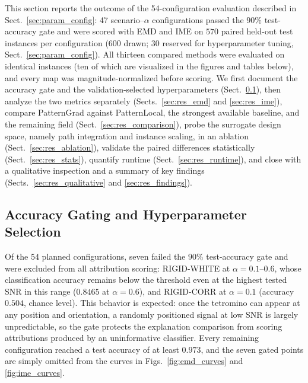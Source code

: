 \documentclass[pdflatex,sn-mathphys-num]{sn-jnl}
\theoremstyle{thmstyleone}
\theoremstyle{thmstyletwo}%
\theoremstyle{thmstylethree}%
\begin{document}
This section reports the outcome of the 54-configuration evaluation described in Sect.~\ref{sec:param_config}: 47 scenario--$\alpha$ configurations passed the $90\%$ test-accuracy gate and were scored with EMD and IME on $570$ paired held-out test instances per configuration ($600$ drawn; $30$ reserved for hyperparameter tuning, Sect.~\ref{sec:param_config}). All thirteen compared methods were evaluated on identical instances (ten of which are visualized in the figures and tables below), and every map was magnitude-normalized before scoring. We first document the accuracy gate and the validation-selected hyperparameters (Sect.~\ref{sec:gate}), then analyze the two metrics separately (Sects.~\ref{sec:res_emd} and \ref{sec:res_ime}), compare PatternGrad against PatternLocal, the strongest available baseline, and the remaining field (Sect.~\ref{sec:res_comparison}), probe the surrogate design space, namely path integration and instance scaling, in an ablation (Sect.~\ref{sec:res_ablation}), validate the paired differences statistically (Sect.~\ref{sec:res_stats}), quantify runtime (Sect.~\ref{sec:res_runtime}), and close with a qualitative inspection and a summary of key findings (Sects.~\ref{sec:res_qualitative} and \ref{sec:res_findings}).

\subsection{Accuracy Gating and Hyperparameter Selection}\label{sec:gate}

Of the 54 planned configurations, seven failed the $90\%$ test-accuracy gate and were excluded from all attribution scoring: RIGID-WHITE at $\alpha = 0.1$--$0.6$, whose classification accuracy remains below the threshold even at the highest tested SNR in this range ($0.8465$ at $\alpha = 0.6$), and RIGID-CORR at $\alpha = 0.1$ (accuracy $0.504$, chance level). This behavior is expected: once the tetromino can appear at any position and orientation, a randomly positioned signal at low SNR is largely unpredictable, so the gate protects the explanation comparison from scoring attributions produced by an uninformative classifier. Every remaining configuration reached a test accuracy of at least $0.973$, and the seven gated points are simply omitted from the curves in Figs.~\ref{fig:emd_curves} and \ref{fig:ime_curves}.
\end{document}
